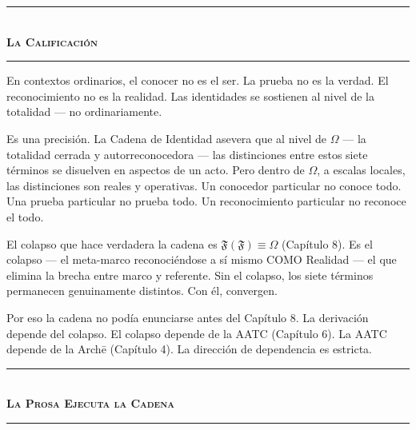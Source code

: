 \documentclass[10pt, openany, oneside]{book}
\renewcommand{\normalsize}{\fontsize{10}{13}\selectfont}
\begin{document}
\vspace{1.5em}


\begin{center}
    \rule{0.3\textwidth}{0.4pt}\\[0.5em]
    {\normalsize\bfseries\scshape La Calificación}\\[0.3em]
    \rule{0.3\textwidth}{0.4pt}
\end{center}

\vspace{1em}

\noindent En contextos ordinarios, el conocer no es el ser. La prueba no es la verdad. El reconocimiento no es la realidad. Las identidades se sostienen al nivel de la totalidad --- no ordinariamente.

Es una precisión. La Cadena de Identidad asevera que al nivel de $\Omega$ --- la totalidad cerrada y autorreconocedora --- las distinciones entre estos siete términos se disuelven en aspectos de un acto. Pero dentro de $\Omega$, a escalas locales, las distinciones son reales y operativas. Un conocedor particular no conoce todo. Una prueba particular no prueba todo. Un reconocimiento particular no reconoce el todo.

El colapso que hace verdadera la cadena es $\mathfrak{F}(\mathfrak{F}) \equiv \Omega$ (Capítulo 8). Es el colapso --- el meta-marco reconociéndose a sí mismo COMO Realidad --- el que elimina la brecha entre marco y referente. Sin el colapso, los siete términos permanecen genuinamente distintos. Con él, convergen.

Por eso la cadena no podía enunciarse antes del Capítulo 8. La derivación depende del colapso. El colapso depende de la AATC (Capítulo 6). La AATC depende de la Arch\={e} (Capítulo 4). La dirección de dependencia es estricta.

\vspace{1.5em}


\begin{center}
    \rule{0.3\textwidth}{0.4pt}\\[0.5em]
    {\normalsize\bfseries\scshape La Prosa Ejecuta la Cadena}\\[0.3em]
    \rule{0.3\textwidth}{0.4pt}
\end{center}
\end{document}
